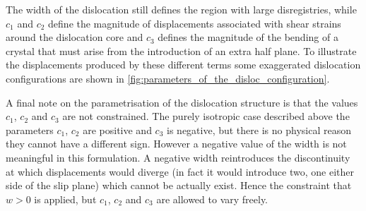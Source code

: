 The width of the dislocation still defines the region with large disregistries, while $c_1$ and $c_2$ define the magnitude of displacements associated with shear strains around the dislocation core and $c_3$ defines the magnitude of the bending of a crystal that must arise from the introduction of an extra half plane.
To illustrate the displacements produced by these different terms some exaggerated dislocation configurations are shown in \autoref{fig:parameters_of_the_disloc_configuration}.





A final note on the parametrisation of the dislocation structure is that the values $c_1$, $c_2$ and $c_3$ are not constrained. The purely isotropic case described above the parameters $c_1$, $c_2$ are positive and $c_3$ is negative, but there is no physical reason they cannot have a different sign. However a negative value of the width is not meaningful in this formulation. A negative width reintroduces the discontinuity at which displacements would diverge (in fact it would introduce two, one either side of the slip plane) which cannot be actually exist. Hence the constraint that $w>0$ is applied, but $c_1$, $c_2$ and $c_3$ are allowed to vary freely.




























